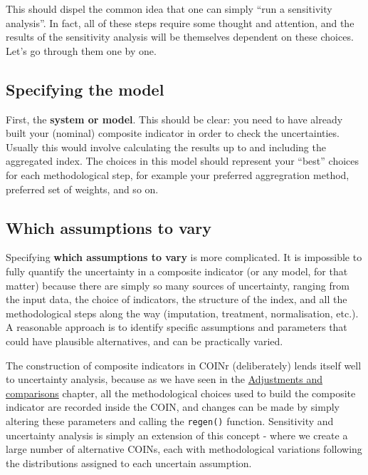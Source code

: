 \documentclass[
]{book}
\begin{document}
This should dispel the common idea that one can simply ``run a sensitivity analysis''. In fact, all of these steps require some thought and attention, and the results of the sensitivity analysis will be themselves dependent on these choices. Let's go through them one by one.

\hypertarget{specifying-the-model}{%
\subsection{Specifying the model}\label{specifying-the-model}}

First, the \textbf{system or model}. This should be clear: you need to have already built your (nominal) composite indicator in order to check the uncertainties. Usually this would involve calculating the results up to and including the aggregated index. The choices in this model should represent your ``best'' choices for each methodological step, for example your preferred aggregration method, preferred set of weights, and so on.

\hypertarget{which-assumptions-to-vary}{%
\subsection{Which assumptions to vary}\label{which-assumptions-to-vary}}

Specifying \textbf{which assumptions to vary} is more complicated. It is impossible to fully quantify the uncertainty in a composite indicator (or any model, for that matter) because there are simply so many sources of uncertainty, ranging from the input data, the choice of indicators, the structure of the index, and all the methodological steps along the way (imputation, treatment, normalisation, etc.). A reasonable approach is to identify specific assumptions and parameters that could have plausible alternatives, and can be practically varied.

The construction of composite indicators in COINr (deliberately) lends itself well to uncertainty analysis, because as we have seen in the \protect\hyperlink{adjustments-and-comparisons}{Adjustments and comparisons} chapter, all the methodological choices used to build the composite indicator are recorded inside the COIN, and changes can be made by simply altering these parameters and calling the \texttt{regen()} function. Sensitivity and uncertainty analysis is simply an extension of this concept - where we create a large number of alternative COINs, each with methodological variations following the distributions assigned to each uncertain assumption.
\end{document}
